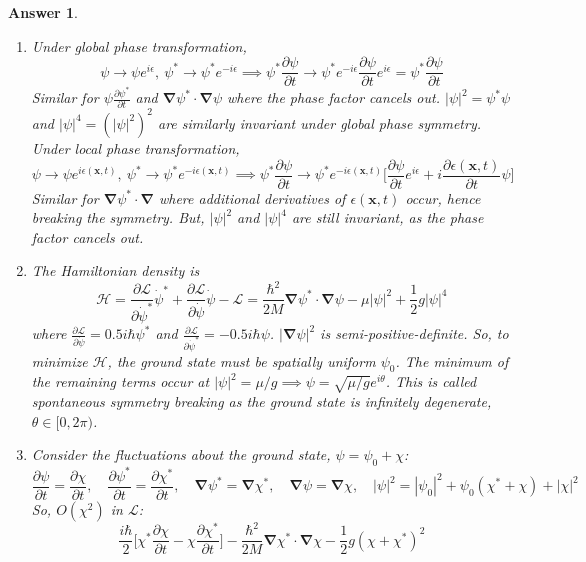 \documentclass[a4paper]{article}
\newtheorem{ans}{Answer}[section]
\theoremstyle{new}
\begin{document}
\begin{ans}\leavevmode
\begin{enumerate}[label=(\alph*)]
\item Under global phase transformation,
$$\psi\rightarrow\psi e^{i\epsilon},~\psi^*\rightarrow\psi^*e^{-i\epsilon}\implies\psi^*\frac{\partial\psi}{\partial t}\rightarrow\psi^*e^{-i\epsilon}\frac{\partial\psi}{\partial t}e^{i\epsilon}=\psi^*\frac{\partial\psi}{\partial t}$$
Similar for $\psi\frac{\partial\psi^*}{\partial t}$ and $\boldsymbol{\nabla}\psi^*\cdot\boldsymbol{\nabla}\psi$ where the phase factor cancels out. $|\psi|^2=\psi^*\psi$ and $|\psi|^4=(|\psi|^2)^2$ are similarly invariant under global phase symmetry. Under local phase transformation,
$$\psi\rightarrow\psi e^{i\epsilon(\mathbf{x},t)},~\psi^*\rightarrow\psi^*e^{-i\epsilon(\mathbf{x},t)}\implies\psi^*\frac{\partial\psi}{\partial t}\rightarrow\psi^*e^{-i\epsilon(\mathbf{x},t)}\bigg[\frac{\partial\psi}{\partial t}e^{i\epsilon}+i\frac{\partial\epsilon(\mathbf{x},t)}{\partial t}\psi\bigg]$$
Similar for $\boldsymbol{\nabla}\psi^*\cdot\boldsymbol{\nabla}$ where additional derivatives of $\epsilon(\mathbf{x},t)$ occur, hence breaking the symmetry. But, $|\psi|^2$ and $|\psi|^4$ are still invariant, as the phase factor cancels out.
\item The Hamiltonian density is
$$\mathcal{H}=\frac{\partial\mathcal{L}}{\partial\dot{\psi}^*}\dot{\psi}^*+\frac{\partial\mathcal{L}}{\partial\dot{\psi}}\dot{\psi}-\mathcal{L}=\frac{\hbar^2}{2M}\boldsymbol{\nabla}\psi^*\cdot\boldsymbol{\nabla}\psi-\mu|\psi|^2+\frac{1}{2}g|\psi|^4$$
where $\frac{\partial\mathcal{L}}{\partial\dot{\psi}}=0.5i\hbar\psi^*$ and $\frac{\partial\mathcal{L}}{\partial\dot{\psi}^*}=-0.5i\hbar\psi$. $|\boldsymbol{\nabla}\psi|^2$ is semi-positive-definite. So, to minimize $\mathcal{H}$, the ground state must be spatially uniform $\psi_0$. The minimum of the remaining terms occur at $|\psi|^2=\mu/g\implies\psi=\sqrt{\mu/g}e^{i\theta}$. This is called spontaneous symmetry breaking as the ground state is infinitely degenerate, $\theta\in[0,2\pi)$.
\item Consider the fluctuations about the ground state, $\psi=\psi_0+\chi$:
$$\frac{\partial\psi}{\partial t}=\frac{\partial\chi}{\partial t},\quad \frac{\partial\psi^*}{\partial t}=\frac{\partial\chi^*}{\partial t},\quad\boldsymbol{\nabla}\psi^*=\boldsymbol{\nabla}\chi^*,\quad\boldsymbol{\nabla}\psi=\boldsymbol{\nabla}\chi,\quad|\psi|^2=|\psi_0|^2+\psi_0(\chi^*+\chi)+|\chi|^2$$
So, $O(\chi^2)$ in $\mathcal{L}$:
$$\frac{i\hbar}{2}\bigg[\chi^*\frac{\partial\chi}{\partial t}-\chi\frac{\partial\chi^*}{\partial t}\bigg]-\frac{\hbar^2}{2M}\boldsymbol{\nabla}\chi^*\cdot\boldsymbol{\nabla}\chi-\frac{1}{2}g(\chi+\chi^*)^2$$

\end{enumerate}
\end{ans}
\end{document}
